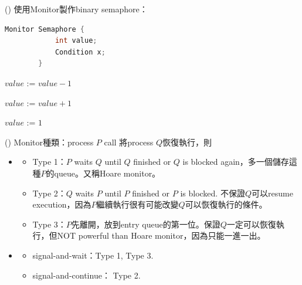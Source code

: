 \begin{theorem}{()} 使用Monitor製作binary semaphore：
    \begin{lstlisting}[caption={Data structure (Making semaphore using monitor).}, language=C, captionpos=b, mathescape=true]
        Monitor Semaphore {
            int value;
            Condition x;
        }
    \end{lstlisting}
    \begin{algorithm}[H]
        \caption{$Wait()$.}
        \begin{algorithmic}[1]
                    \State {}
                \EndIf
                \State $value$ := $value - 1$
            \EndFunction
        \end{algorithmic}
    \end{algorithm}
    \begin{algorithm}[H]
        \caption{$Signal()$.}
        \begin{algorithmic}[1]
                \State $value$ := $value + 1$
                \State {}
            \EndFunction
        \end{algorithmic}
    \end{algorithm}
    \begin{algorithm}[H]
        \caption{$initialization\_code()$.}
        \begin{algorithmic}[1]
                \State $value$ := $1$
            \EndFunction
        \end{algorithmic}
    \end{algorithm}
\end{theorem}

\begin{theorem}{()} Monitor種類：process $P$ call 將process $Q$恢復執行，則\begin{itemize}
        \item \begin{itemize}
            \item Type 1：$P$ waits $Q$ until $Q$ finished or $Q$ is blocked again，多一個儲存這種$P$的queue。又稱Hoare monitor。
            \item Type 2：$Q$ waits $P$ until $P$ finished or $P$ is blocked. 不保證$Q$可以resume execution，因為$P$繼續執行很有可能改變$Q$可以恢復執行的條件。
            \item Type 3：$P$先離開，放到entry queue的第一位。保證$Q$一定可以恢復執行，但NOT powerful than Hoare monitor，因為只能一進一出。
        \end{itemize}
        \item \begin{itemize}
            \item signal-and-wait：Type 1, Type 3.
            \item signal-and-continue： Type 2.
        \end{itemize}
    \end{itemize}
\end{theorem}

